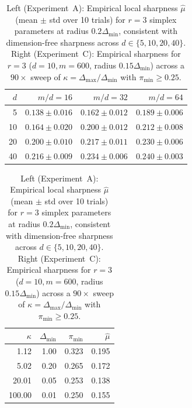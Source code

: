 \documentclass[11pt]{article}
\theoremstyle{plain}
\theoremstyle{remark}
\numberwithin{equation}{section}
\begin{document}
\begin{table}[t]
  \centering
  \footnotesize
  \caption{Left (Experiment~A): Empirical local sharpness $\hat\mu$ (mean $\pm$ std over 10 trials) for $r=3$ simplex parameters at radius $0.2\Delta_{\min}$, consistent with dimension-free sharpness across $d \in \{5, 10, 20, 40\}$. Right (Experiment~C): Empirical sharpness for $r=3$ ($d=10, m=600$, radius $0.15\Delta_{\min}$) across a $90\times$ sweep of $\kappa = \Delta_{\max}/\Delta_{\min}$ with $\pi_{\min} \ge 0.25$.}
  \label{tab:dim-kappa}
  \begin{tabular}{@{}rrrr@{}}
    \toprule
    $d$ & $m/d=16$ & $m/d=32$ & $m/d=64$ \\
    \midrule
     5 & $0.138 \pm 0.016$ & $0.162 \pm 0.012$ & $0.189 \pm 0.006$ \\
    10 & $0.164 \pm 0.020$ & $0.200 \pm 0.012$ & $0.212 \pm 0.008$ \\
    20 & $0.200 \pm 0.010$ & $0.217 \pm 0.011$ & $0.230 \pm 0.006$ \\
    40 & $0.216 \pm 0.009$ & $0.234 \pm 0.006$ & $0.240 \pm 0.003$ \\
    \bottomrule
  \end{tabular}
  \hspace{1.2em}
  \begin{tabular}{@{}rrrr@{}}
    \toprule
    $\kappa$ & $\Delta_{\min}$ & $\pi_{\min}$ & $\hat\mu$ \\
    \midrule
      1.12 & 1.00 & 0.323 & 0.195 \\
      5.02 & 0.20 & 0.265 & 0.172 \\
     20.01 & 0.05 & 0.253 & 0.138 \\
    100.00 & 0.01 & 0.250 & 0.155 \\
    \bottomrule
  \end{tabular}
\end{table}
\end{document}
